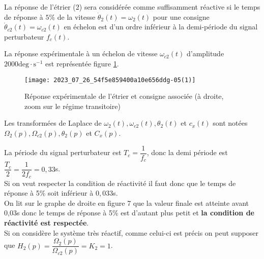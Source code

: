 La réponse de l'étrier (2) sera considérée comme suffisamment réactive si le temps de réponse à $5 \%$ de la vitesse $\dot{\theta}_{2}(t)=\omega_{2}(t)$ pour une consigne $\dot{\theta}_{c 2}(t)=\omega_{c 2}(t)$ en échelon est d'un ordre inférieur à la demi-période du signal perturbateur $f_{c}(t)$.

La réponse expérimentale à un échelon de vitesse $\omega_{c 2}(t)$ d'amplitude $2000 \mathrm{deg} \cdot \mathrm{s}^{-1}$ est représentée figure \ref{fig_ccspsi2022:07}.

\begin{figure}[!h]
\centering
\texttt{[image: 2023\_07\_26\_54f5e859400a10e656ddg-05(1)]}
\caption{\label{fig_ccspsi2022:07}Réponse expérimentale de l'étrier et consigne associée (à droite, zoom sur le régime transitoire)}
\end{figure}

Les transformées de Laplace de $\omega_{2}(t), \omega_{c 2}(t), \theta_{2}(t)$ et $c_{x}(t)$ sont notées $\Omega_{2}(p), \Omega_{c 2}(p), \theta_{2}(p)$ et $C_{x}(p)$.

\ifprof
\begin{corrige}
La période du signal perturbateur est $T_c = \dfrac{1}{f_c}$, donc la demi période est $\dfrac{T_c}{2} = \dfrac{1}{2f_c} = 0,33$s.\\

Si on veut respecter la condition de réactivité il faut donc que le temps de réponse à 5\% soit inférieur à $0,033$s.\\

On lit sur le graphe de droite en figure 7 que la valeur finale est atteinte avant 0,03s donc le temps de réponse à 5\% est d'autant plus petit et \textbf{la condition de réactivité est respectée}.\\

Si on considère le système très réactif, comme celui-ci est précis on peut supposer que $\boxed{H_2(p) = \dfrac{\Omega_2(p)}{\Omega_{c2}(p)} = K_2 = 1}$.
\end{corrige}
\else
\fi

